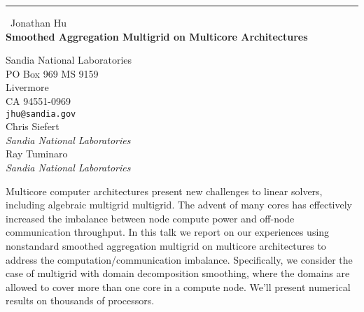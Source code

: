 \documentclass{report}
\begin{document}
\begin{center}
\rule{6in}{1pt} \
{\large Jonathan Hu \\
{\bf Smoothed Aggregation Multigrid on Multicore Architectures}}

Sandia National Laboratories \\ PO Box 969 MS 9159 \\ Livermore \\ CA 94551-0969
\\
{\tt jhu@sandia.gov}\\
Chris Siefert\\
{\em Sandia National Laboratories}\\
Ray Tuminaro\\
{\em Sandia National Laboratories}\end{center}

Multicore computer architectures present new challenges to linear
solvers, including algebraic multigrid multigrid. The advent of many
cores has effectively increased the imbalance between node compute power
and off-node communication throughput. In this talk we report on our
experiences using nonstandard smoothed aggregation multigrid on multicore
architectures to address the computation/communication imbalance.
Specifically, we consider the case of multigrid with domain decomposition
smoothing, where the domains are allowed to cover more than one core in a
compute node. We'll present numerical results on thousands of processors.
\end{document}
